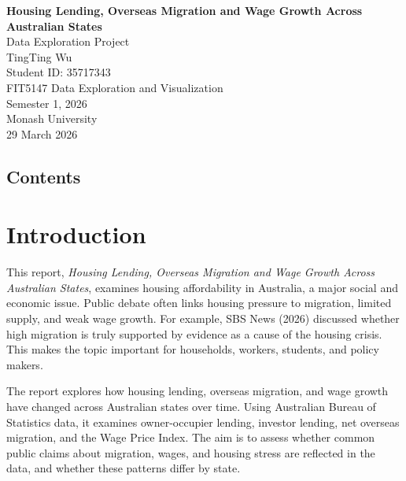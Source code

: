 \documentclass[
  11pt,
  a4paper,
]{article}
\author{}
\date{}
\begin{document}
\thispagestyle{empty}

\vspace*{3cm}

\begin{center}
{\Large \textbf{Housing Lending, Overseas Migration and Wage Growth Across Australian States}}\\[0.8cm]

{\large Data Exploration Project}\\[1.8cm]

TingTing Wu\\
Student ID: 35717343\\[1.2cm]

FIT5147 Data Exploration and Visualization\\
Semester 1, 2026\\
Monash University\\[1.2cm]

29 March 2026
\end{center}

\newpage

\thispagestyle{plain}
\begin{center}
\section*{Contents}
\end{center}

\tableofcontents

\newpage

\section{Introduction}\label{introduction}

This report, \emph{Housing Lending, Overseas Migration and Wage Growth
Across Australian States}, examines housing affordability in Australia,
a major social and economic issue. Public debate often links housing
pressure to migration, limited supply, and weak wage growth. For
example, SBS News (2026) discussed whether high migration is truly
supported by evidence as a cause of the housing crisis. This makes the
topic important for households, workers, students, and policy makers.

The report explores how housing lending, overseas migration, and wage
growth have changed across Australian states over time. Using Australian
Bureau of Statistics data, it examines owner-occupier lending, investor
lending, net overseas migration, and the Wage Price Index. The aim is to
assess whether common public claims about migration, wages, and housing
stress are reflected in the data, and whether these patterns differ by
state.
\end{document}
